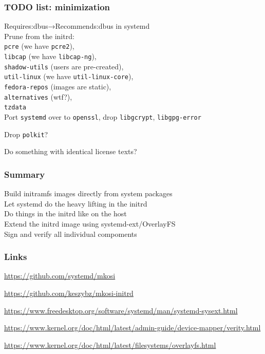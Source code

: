 \documentclass[]{beamer}
\begin{document}
\begin{frame}
  \frametitle{TODO list: minimization}

  Requires:dbus→Recommends:dbus in systemd\\

  Prune from the initrd:\\
  \texttt{pcre} (we have \texttt{pcre2}),\\
  \texttt{libcap} (we have \texttt{libcap-ng}),\\
  \texttt{shadow-utils} (users are pre-created),\\
  \texttt{util-linux} (we have \texttt{util-linux-core}),\\
  \texttt{fedora-repos} (images are static),\\
  \texttt{alternatives} (wtf?),\\
  \texttt{tzdata}\\

  Port \texttt{systemd} over to \texttt{openssl}, drop \texttt{libgcrypt}, \texttt{libgpg-error}

  Drop \texttt{polkit}?

  Do something with identical license texts?
\end{frame}

\begin{frame}
  \frametitle{Summary}

  Build initramfs images directly from system packages\\
  Let systemd do the heavy lifting in the initrd\\
  Do things in the initrd like on the host\\
  Extend the initrd image using systemd-ext/OverlayFS\\
  Sign and verify all individual compoments

\end{frame}

\begin{frame}[fragile]
  \frametitle{Links}

  \url{https://github.com/systemd/mkosi}

  \url{https://github.com/keszybz/mkosi-initrd}

  \url{https://www.freedesktop.org/software/systemd/man/systemd-sysext.html}

  \url{https://www.kernel.org/doc/html/latest/admin-guide/device-mapper/verity.html}

  \url{https://www.kernel.org/doc/html/latest/filesystems/overlayfs.html}

\end{frame}
\end{document}
